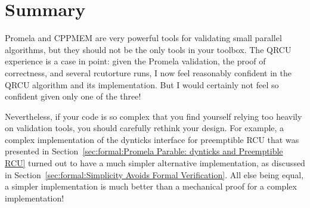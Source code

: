 \section{Summary}
\label{sec:formal:Summary}

Promela and CPPMEM are very powerful tools for validating small
parallel algorithms, but they should not be the only tools in your
toolbox.
The QRCU experience is a case in point: given the Promela validation,
the proof of correctness, and several
rcutorture
runs, I now feel
reasonably confident in the QRCU algorithm and its implementation.
But I would certainly not feel so confident given only one of the three!

Nevertheless, if your code is so complex that you find yourself
relying too heavily on validation
tools, you should carefully rethink your design.
For example, a complex implementation of the dynticks interface for
preemptible RCU that was presented in
Section~\ref{sec:formal:Promela Parable: dynticks and Preemptible RCU}
turned out to
have a much simpler alternative implementation, as discussed in
Section~\ref{sec:formal:Simplicity Avoids Formal Verification}.
All else being equal, a simpler implementation is much better than
a mechanical proof for a complex implementation!
